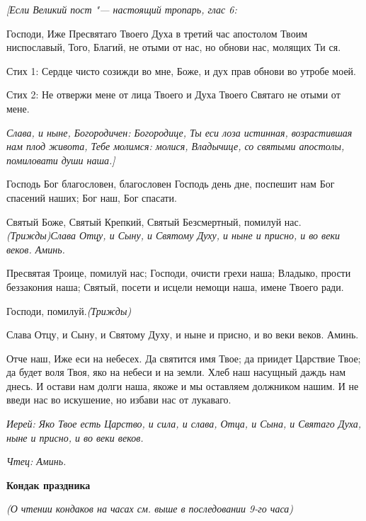 \itshape [Если Великий пост "--- настоящий тропарь, глас \normalfont{}6:



Господи, Иже Пресвятаго Твоего Духа в третий час апостолом Твоим ниспославый, Того, Благий, не отыми от нас, но обнови нас, молящих Ти ся.



Стих 1: Сердце чисто созижди во мне, Боже, и дух прав обнови во утробе моей. 



Стих 2: Не отвержи мене от лица Твоего и Духа Твоего Святаго не отыми от мене. 


\itshape Слава, и ныне, Богородичен:\normalfont{} Богородице, Ты еси лоза истинная, возрастившая нам плод живота, Тебе молимся: молися, Владычице, со святыми апостолы, помиловати души наша.]



Господь Бог благословен, благословен Господь день дне, поспешит нам Бог спасений наших; Бог наш, Бог спасати.



Святый Боже, Святый Крепкий, Святый Безсмертный, помилуй нас.\itshape  (Трижды)\normalfont{}Слава Отцу, и Сыну, и Святому Духу, и ныне и присно, и во веки веков. Аминь.



Пресвятая Троице, помилуй нас; Господи, очисти грехи наша; Владыко, прости беззакония наша; Святый, посети и исцели немощи наша, имене Твоего ради.



Господи, помилуй.\itshape  (Трижды)\normalfont{}



Слава Отцу, и Сыну, и Святому Духу, и ныне и присно, и во веки веков. Аминь.



Отче наш, Иже еси на небесех. Да святится имя Твое; да приидет Царствие Твое; да будет воля Твоя, яко на небеси и на земли. Хлеб наш насущный даждь нам днесь. И остави нам долги наша, якоже и мы оставляем должником нашим. И не введи нас во искушение, но избави нас от лукаваго.


\itshape Иерей:\normalfont{} Яко Твое есть Царство, и сила, и слава, Отца, и Сына, и Святаго Духа, ныне и присно, и во веки веков.


\itshape Чтец:\normalfont{} Аминь.


\medskip
\bfseries Кондак праздника\normalfont{}


\itshape (О чтении кондаков на часах см. выше в последовании 9-го час\normalfont{}а)


